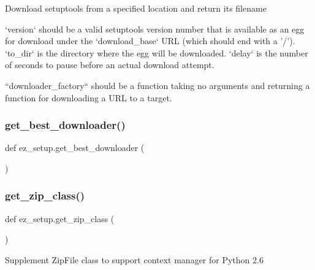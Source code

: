 \begin{DoxyVerb}Download setuptools from a specified location and return its filename

`version` should be a valid setuptools version number that is available
as an egg for download under the `download_base` URL (which should end
with a '/'). `to_dir` is the directory where the egg will be downloaded.
`delay` is the number of seconds to pause before an actual download
attempt.

``downloader_factory`` should be a function taking no arguments and
returning a function for downloading a URL to a target.
\end{DoxyVerb}
 \mbox{\label{namespaceez__setup_a37c9e523f99cd7b5cfd01eada43de9ad}} 
\subsubsection{\texorpdfstring{get\+\_\+best\+\_\+downloader()}{get\_best\_downloader()}}
{\footnotesize\ttfamily def ez\+\_\+setup.\+get\+\_\+best\+\_\+downloader (\begin{DoxyParamCaption}{ }\end{DoxyParamCaption})}

\mbox{\label{namespaceez__setup_a61495793b812c47ba054dd058fa4ba0e}} 
\subsubsection{\texorpdfstring{get\+\_\+zip\+\_\+class()}{get\_zip\_class()}}
{\footnotesize\ttfamily def ez\+\_\+setup.\+get\+\_\+zip\+\_\+class (\begin{DoxyParamCaption}{ }\end{DoxyParamCaption})}

\begin{DoxyVerb}Supplement ZipFile class to support context manager for Python 2.6
\end{DoxyVerb}
 \mbox{\label{namespaceez__setup_a4377c05e875ddaef521db5db8d5d97d8}} 
